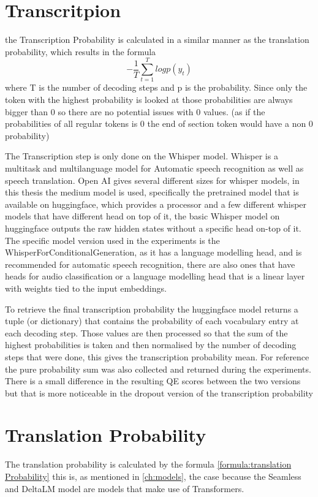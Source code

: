 \section{Transcritpion}
the Transcription Probability is calculated in a similar manner as the translation probability, which results in the formula $$-\frac{1}{T}\sum_{t=1}^T log p(y_t)$$ where T is the number of decoding steps and p is the probability.
Since only the token with the highest probability is looked at those probabilities are always bigger than 0 so there are no potential issues with 0 values. (as if the probabilities of all regular tokens is 0 the end of section token would have a non 0 probability)

The Transcription step is only done on the Whisper model.
Whisper \cite{radford2022robust} is a multitask and multilanguage model for Automatic speech recognition as well as speech translation. 
Open AI gives several different sizes for whisper models, in this thesis the medium model is used, specifically the pretrained model that is available on huggingface, which provides a processor and a few different whisper models that have different head on top of it, the basic Whisper model on huggingface outputs the raw hidden states without a specific head on-top of it. 
The specific model version used in the experiments is the WhisperForConditionalGeneration, as it has a language modelling head, and is recommended for automatic speech recognition, there are also ones that have heads for audio classification or a language modelling head that is a linear layer with weights tied to the input embeddings. 

To retrieve the final transcription probability the huggingface model returns a tuple (or dictionary) that contains the probability of each vocabulary entry at each decoding step.
Those values are then processed so that the sum of the highest probabilities is taken and then normalised by the number of decoding steps that were done, this gives the transcription probability mean. For reference the pure probability sum was also collected and returned during the experiments. 
There is a small difference in the resulting QE scores between the two versions but that is more noticeable in the dropout version of the transcription probability 

\section{Translation Probability}\label{sect:translationprob}
The translation probability is calculated by the formula \autoref{formula:translation Probability} this is, as mentioned in \autoref{ch:models}, the case because the Seamless and DeltaLM model are models that make use of Transformers. 

